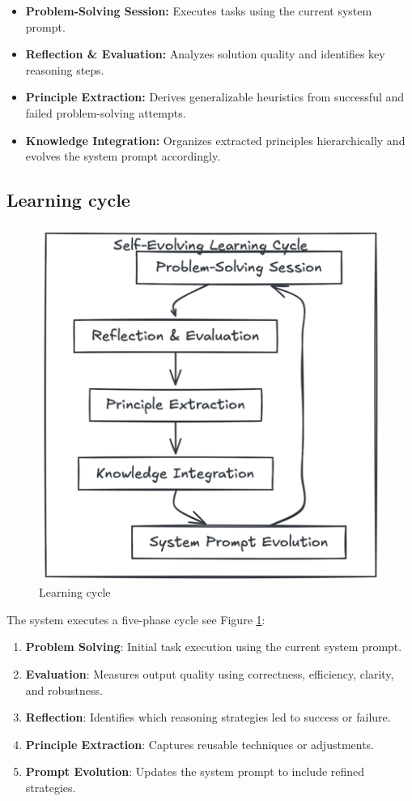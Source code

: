 \documentclass[10pt,a4paper,twocolumn]{article}
\begin{document}
\begin{itemize}
    \item \textbf{Problem-Solving Session:} Executes tasks using the current system prompt.
    \item \textbf{Reflection \& Evaluation:} Analyzes solution quality and identifies key reasoning steps.
    \item \textbf{Principle Extraction:} Derives generalizable heuristics from successful and failed problem-solving attempts.
    \item \textbf{Knowledge Integration:} Organizes extracted principles hierarchically and evolves the system prompt accordingly.
\end{itemize}



\subsection{Learning cycle}


\begin{figure}
    \centering
    \includegraphics[width=0.75\linewidth]{learning_cycle.png}
    \caption{Learning cycle}
    \label{fig:cycle}
\end{figure}





 The system executes a five-phase cycle see Figure \ref{fig:cycle}:

\begin{enumerate}
    \item \textbf{Problem Solving}: Initial task execution using the current system prompt.
    \item \textbf{Evaluation}: Measures output quality using correctness, efficiency, clarity, and robustness.
    \item \textbf{Reflection}: Identifies which reasoning strategies led to success or failure.
    \item \textbf{Principle Extraction}: Captures reusable techniques or adjustments.
    \item \textbf{Prompt Evolution}: Updates the system prompt to include refined strategies.
\end{enumerate}
\end{document}
